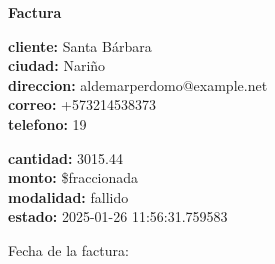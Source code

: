 \documentclass{article}
\begin{document}
\begin{center}
    {\LARGE \textbf{Factura}}\\[1cm]
\end{center}

\textbf{cliente:} Santa Bárbara \\
\textbf{ciudad:} Nariño \\
\textbf{direccion:} aldemarperdomo@example.net \\
\textbf{correo:} +573214538373 \\
\textbf{telefono:} 19 \\

\vspace{0.5cm}

\textbf{cantidad:} 3015.44 \\
\textbf{monto:} \$fraccionada \\
\textbf{modalidad:} fallido \\
\textbf{estado:} 2025-01-26 11:56:31.759583 \\

\vspace{1cm}

Fecha de la factura: 
\end{document}
